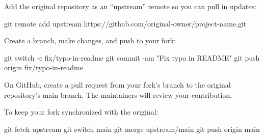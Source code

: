 \documentclass[
  letterpaper,
  DIV=11,
  numbers=noendperiod]{scrreprt}
\newenvironment{Shaded}{\begin{snugshade}}{\end{snugshade}}
\newcommand{\AttributeTok}[1]{\textcolor[rgb]{0.40,0.45,0.13}{#1}}
\newcommand{\FunctionTok}[1]{\textcolor[rgb]{0.28,0.35,0.67}{#1}}
\newcommand{\NormalTok}[1]{\textcolor[rgb]{0.00,0.23,0.31}{#1}}
\newcommand{\StringTok}[1]{\textcolor[rgb]{0.13,0.47,0.30}{#1}}
\begin{document}
Add the original repository as an ``upstream'' remote so you can pull in
updates:

\begin{codelisting}

\caption{\texttt{terminal}}

\begin{Shaded}
\begin{Highlighting}[]
\FunctionTok{git}\NormalTok{ remote add upstream https://github.com/original{-}owner/project{-}name.git}
\end{Highlighting}
\end{Shaded}

\end{codelisting}

Create a branch, make changes, and push to your fork:

\begin{codelisting}

\caption{\texttt{terminal}}

\begin{Shaded}
\begin{Highlighting}[]
\FunctionTok{git}\NormalTok{ switch }\AttributeTok{{-}c}\NormalTok{ fix/typo{-}in{-}readme}
\FunctionTok{git}\NormalTok{ commit }\AttributeTok{{-}am} \StringTok{"Fix typo in README"}
\FunctionTok{git}\NormalTok{ push origin fix/typo{-}in{-}readme}
\end{Highlighting}
\end{Shaded}

\end{codelisting}

On GitHub, create a pull request from your fork's branch to the original
repository's main branch. The maintainers will review your contribution.

To keep your fork synchronized with the original:

\begin{codelisting}

\caption{\texttt{terminal}}

\begin{Shaded}
\begin{Highlighting}[]
\FunctionTok{git}\NormalTok{ fetch upstream}
\FunctionTok{git}\NormalTok{ switch main}
\FunctionTok{git}\NormalTok{ merge upstream/main}
\FunctionTok{git}\NormalTok{ push origin main}
\end{Highlighting}
\end{Shaded}

\end{codelisting}
\end{document}
